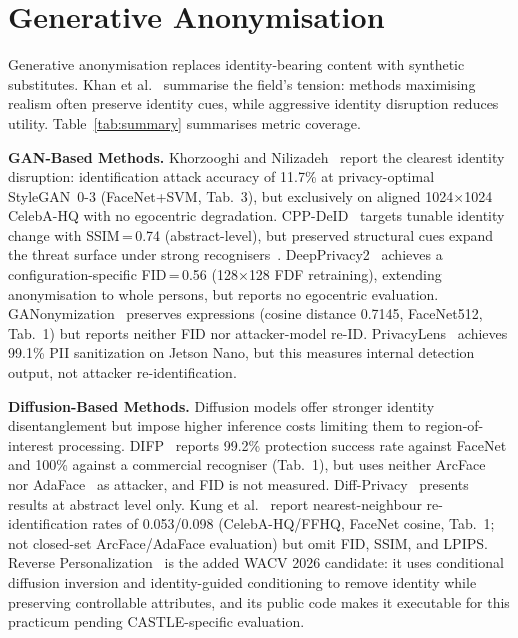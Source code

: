 \documentclass[10pt, twocolumn]{IEEEtran}
\begin{document}
\section{Generative Anonymisation}
\label{sec:genanon}

Generative anonymisation replaces identity-bearing content with synthetic substitutes. Khan et al.~\cite{khan2024survey} summarise the field's tension: methods maximising realism often preserve identity cues, while aggressive identity disruption reduces utility. Table~\ref{tab:summary} summarises metric coverage.

\textbf{GAN-Based Methods.} Khorzooghi and Nilizadeh~\cite{khorzooghi2023gan} report the clearest identity disruption: identification attack accuracy of 11.7\% at privacy-optimal StyleGAN~0-3 (FaceNet+SVM, Tab.~3), but exclusively on aligned 1024$\times$1024 CelebA-HQ with no egocentric degradation. CPP-DeID~\cite{meden2023cppdeidentification} targets tunable identity change with SSIM\,=\,0.74 (abstract-level), but preserved structural cues expand the threat surface under strong recognisers~\cite{kim2022adaface}. DeepPrivacy2~\cite{hukkelas2023deepprivacy2} achieves a configuration-specific FID\,=\,0.56 (128$\times$128 FDF retraining), extending anonymisation to whole persons, but reports no egocentric evaluation. GANonymization~\cite{hellmann2024ganonymization} preserves expressions (cosine distance 0.7145, FaceNet512, Tab.~1) but reports neither FID nor attacker-model re-ID. PrivacyLens~\cite{iravantchi2024privacylens} achieves 99.1\% PII sanitization on Jetson Nano, but this measures internal detection output, not attacker re-identification.

\textbf{Diffusion-Based Methods.} Diffusion models offer stronger identity disentanglement but impose higher inference costs limiting them to region-of-interest processing. DIFP~\cite{you2024difp} reports 99.2\% protection success rate against FaceNet and 100\% against a commercial recogniser (Tab.~1), but uses neither ArcFace~\cite{deng2019arcface} nor AdaFace~\cite{kim2022adaface} as attacker, and FID is not measured. Diff-Privacy~\cite{he2024diffprivacy} presents results at abstract level only. Kung et al.~\cite{kung2025face} report nearest-neighbour re-identification rates of 0.053/0.098 (CelebA-HQ/FFHQ, FaceNet cosine, Tab.~1; not closed-set ArcFace/AdaFace evaluation) but omit FID, SSIM, and LPIPS. Reverse Personalization~\cite{kung2026reverse} is the added WACV 2026 candidate: it uses conditional diffusion inversion and identity-guided conditioning to remove identity while preserving controllable attributes, and its public code makes it executable for this practicum pending CASTLE-specific evaluation.
\end{document}
